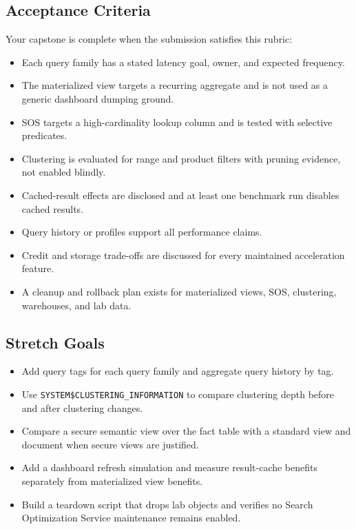 \subsection*{Acceptance Criteria}
Your capstone is complete when the submission satisfies this rubric:
\begin{itemize}
    \item Each query family has a stated latency goal, owner, and expected frequency.
    \item The materialized view targets a recurring aggregate and is not used as a generic dashboard dumping ground.
    \item SOS targets a high-cardinality lookup column and is tested with selective predicates.
    \item Clustering is evaluated for range and product filters with pruning evidence, not enabled blindly.
    \item Cached-result effects are disclosed and at least one benchmark run disables cached results.
    \item Query history or profiles support all performance claims.
    \item Credit and storage trade-offs are discussed for every maintained acceleration feature.
    \item A cleanup and rollback plan exists for materialized views, SOS, clustering, warehouses, and lab data.
\end{itemize}
\subsection*{Stretch Goals}
\begin{itemize}
    \item Add query tags for each query family and aggregate query history by tag.
    \item Use \texttt{SYSTEM\$CLUSTERING\_INFORMATION} to compare clustering depth before and after clustering changes.
    \item Compare a secure semantic view over the fact table with a standard view and document when secure views are justified.
    \item Add a dashboard refresh simulation and measure result-cache benefits separately from materialized view benefits.
    \item Build a teardown script that drops lab objects and verifies no Search Optimization Service maintenance remains enabled.
\end{itemize}
